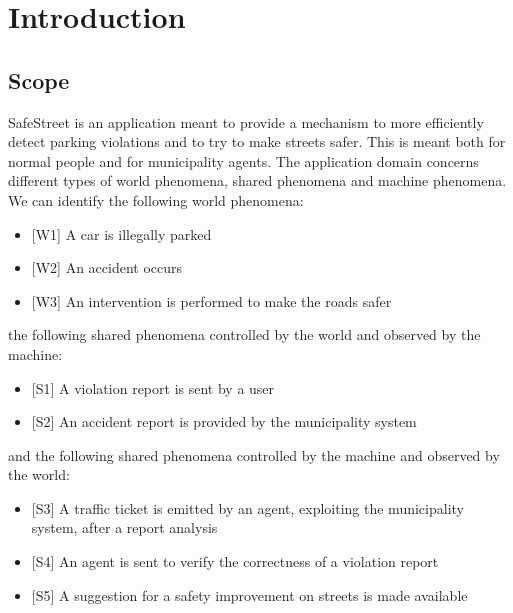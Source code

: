 \documentclass[a4paper]{report}
\begin{document}
\tableofcontents

\chapter{Introduction}
\section{Scope}
SafeStreet is an application meant to provide a mechanism to more efficiently detect parking violations and to try to make streets safer. This is meant both for normal people and for municipality agents. 
The application domain concerns different types of world phenomena, shared phenomena and machine phenomena. \\
We can identify the following world phenomena:
\begin{itemize}
\item {[W1]} A car is illegally parked 
\item {[W2]} An accident occurs
\item {[W3]} An intervention is performed to make the roads safer
\end{itemize} 
the following shared phenomena controlled by the world and observed by the machine:
\begin{itemize}
\item {[S1]} A violation report is sent by a user
\item {[S2]} An accident report is provided by the municipality system
\end{itemize}
and the following shared phenomena controlled by the machine and observed by the world:
\begin{itemize}
\item {[S3]} A traffic ticket is emitted by an agent, exploiting the municipality system, after a report analysis
\item {[S4]} An agent is sent to verify the correctness of a violation report
\item {[S5]} A suggestion for a safety improvement on streets is made available
\end{itemize}
\end{document}
